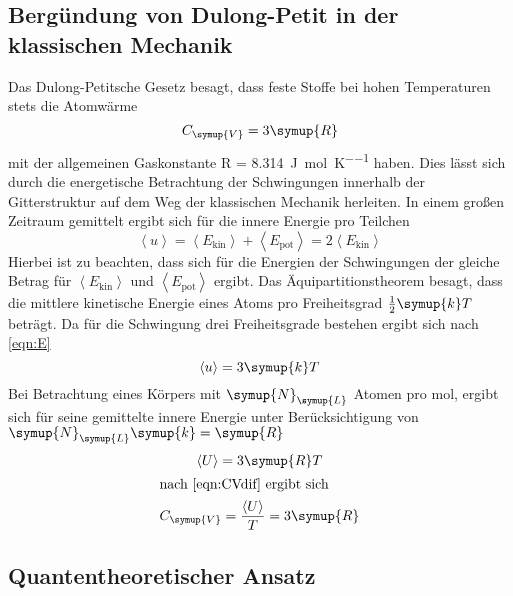 \subsection{Bergündung von Dulong-Petit in der klassischen Mechanik}
Das Dulong-Petitsche Gesetz besagt, dass feste Stoffe bei hohen Temperaturen
stets die Atomwärme
\begin{equation}
  C_\symup{V}= 3\symup{R}
\end{equation}
mit der allgemeinen Gaskonstante R = \SI{8,314}{\joule\per\mol\per\kelvin}
haben. Dies lässt sich durch die energetische Betrachtung der Schwingungen innerhalb
der Gitterstruktur auf dem Weg der klassischen Mechanik herleiten.
In einem großen Zeitraum gemittelt ergibt sich für die innere Energie pro Teilchen
\begin{equation}
  \left<u\right> = \left<E_\text{kin}\right> + \left<E_\text{pot}\right>
  = 2\left<E_\text{kin}\right>
  \label{eqn:E}
\end{equation}
Hierbei ist zu beachten, dass sich für die Energien der Schwingungen der gleiche
Betrag für $\left<E_\text{kin}\right>$ und $\left<E_\text{pot}\right>$ ergibt.
Das Äquipartitionstheorem besagt, dass die mittlere kinetische Energie eines Atoms
pro Freiheitsgrad
$\frac{1}{2}\symup{k}T$ beträgt. Da für die Schwingung drei Freiheitsgrade bestehen
ergibt sich nach \eqref{eqn:E}
\begin{equation}
  \left<u\right> = 3\symup{k}T
\end{equation}
Bei Betrachtung eines Körpers mit $\symup{N}_\symup{L}$ Atomen pro mol, ergibt sich für
seine gemittelte innere Energie unter Berücksichtigung von $\symup{N}_\symup{L}\symup{k} = \symup{R}$
\begin{gather}
  \left<U\right> = 3\symup{R}T\\
  \intertext{nach \eqref{eqn:CVdif} ergibt sich}
  C_\symup{V} = \frac{\left<U\right>}{T} = 3\symup{R}
\end{gather}
\subsection{Quantentheoretischer Ansatz}
